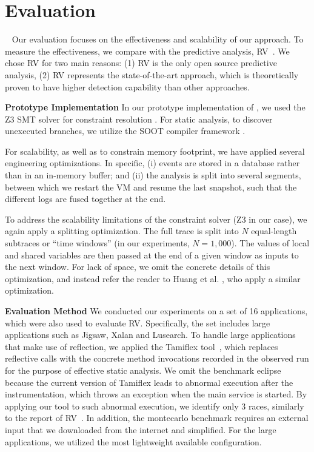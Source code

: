 \section{Evaluation}~\label{sec:eval}
Our evaluation focuses on the effectiveness  and scalability of our approach.
To measure the effectiveness, we compare with the predictive analysis, {\sf RV}~\cite{}. We chose RV for two main reasons: (1) {\sf RV} is the only open source predictive analysis, (2) {\sf RV} represents the state-of-the-art approach, which is theoretically proven to have higher detection capability than other approaches. 

{\bf Prototype Implementation}  In our prototype implementation of \tool, we used the Z3 SMT solver for constraint resolution \cite{MouraB08}. For static analysis, to discover unexecuted branches, we utilize the SOOT compiler framework \cite{Vallee-RaiCGHLS99}.

For scalability, as well as to constrain memory footprint, we have applied several engineering optimizations. In specific, (i) events are stored in a database rather than in an in-memory buffer; and (ii) the analysis is split into several segments, between which we restart the VM and resume the last snapshot, such that the different logs are fused together at the end. 

To address the scalability limitations of the constraint solver (Z3 in our case), we again apply a splitting optimization. The full trace is split into $N$ equal-length subtraces or ``time windows'' (in our experiments, $N=1,000$). The values of local and shared variables are then passed at the end of a given window as inputs to the next window. For lack of space, we omit the concrete details of this optimization, and instead refer the reader to Huang et al. \cite{HuangMR14}, who apply a similar optimization.


{\bf Evaluation Method} We conducted our experiments on a set of 16 applications, which were also used to evaluate {\sf RV}. Specifically, the set includes large applications such as {\sf Jigsaw}, {\sf Xalan} and {\sf Lusearch}. To handle large applications that make use of reflection, we applied the {\sf Tamiflex} tool~\cite{}, which replaces reflective calls with the concrete method invocations recorded in the observed run for the purpose of effective static analysis.  We omit the benchmark {\sf eclipse} because the current version of {\sf Tamiflex}  leads to abnormal execution after the instrumentation, which throws an exception when the main service is started. By applying our tool to such abnormal execution, we identify only 3 races, similarly to the report of RV~\cite{}.
In addition, the {\sf montecarlo} benchmark requires an external input that we downloaded from the internet and simplified. For the large applications, we utilized the most lightweight available configuration.


